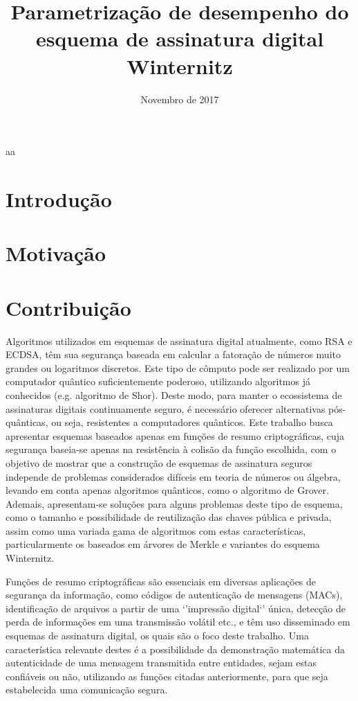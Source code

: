 \documentclass[12pt]{article}
\title{Parametrização de desempenho do esquema de assinatura digital Winternitz}
\author{}
\date{Novembro de 2017}
\begin{document}
\begin{center}
    \Large{aa}
\end{center}

\maketitle

\section{Introdução}



\section{Motivação}

\section{Contribuição}

Algoritmos utilizados em esquemas de assinatura digital atualmente, como RSA
e ECDSA, têm sua segurança baseada em calcular a fatoração de números muito
grandes ou logaritmos discretos. Este tipo de cômputo pode ser realizado por
um computador quântico suficientemente poderoso, utilizando algoritmos já
conhecidos (e.g. algoritmo de Shor). Deste modo, para manter o ecossistema de
assinaturas digitais continuamente seguro, é necessário oferecer alternativas
pós-quânticas, ou seja, resistentes a computadores quânticos. Este trabalho
busca apresentar esquemas baseados apenas em funções de resumo
criptográficas, cuja segurança baseia-se apenas na resistência à colisão da
função escolhida, com o objetivo de mostrar que a construção de esquemas de
assinatura seguros independe de problemas considerados difíceis em teoria de
números ou álgebra, levando em conta apenas algoritmos quânticos, como o
algoritmo de Grover. Ademais, apresentam-se soluções para alguns problemas
deste tipo de esquema, como o tamanho e possibilidade de reutilização das
chaves pública e privada, assim como uma variada gama de algoritmos com estas
características, particularmente os baseados em árvores de Merkle e variantes
do esquema Winternitz.

Funções de resumo criptográficas são essenciais em diversas aplicações de
segurança da informação, como códigos de autenticação de mensagens (MACs),
identificação de arquivos a partir de uma `'impressão digital`' única, detecção
de perda de informações em uma transmissão volátil etc., e têm uso disseminado
em esquemas de assinatura digital, os quais são o foco deste trabalho. Uma
característica relevante destes é a possibilidade da demonstração matemática da
autenticidade de uma mensagem transmitida entre entidades, sejam estas
confiáveis ou não, utilizando as funções citadas anteriormente, para que seja
estabelecida uma comunicação segura.
\end{document}
